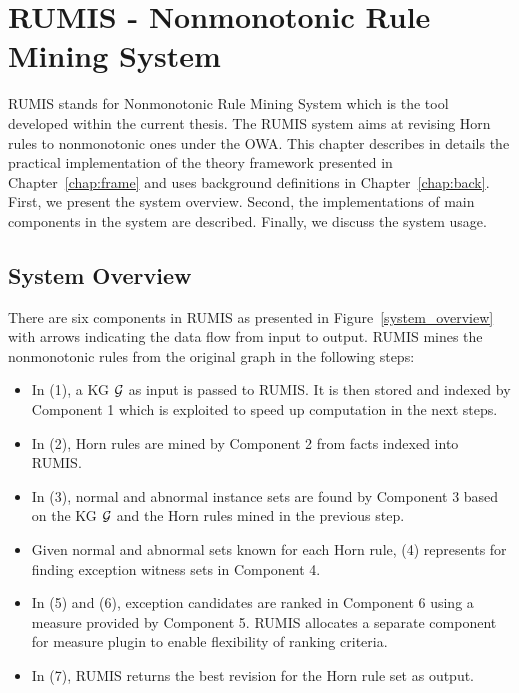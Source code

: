 \chapter{RUMIS - Nonmonotonic Rule Mining System}\label{chap:system}
\label{chap:system}

RUMIS stands for Nonmonotonic Rule Mining System which is the tool developed within the current thesis. The RUMIS system aims at revising Horn rules to nonmonotonic ones under the OWA. This chapter describes in details the practical implementation of the theory framework presented in Chapter~\ref{chap:frame} and uses background definitions in Chapter~\ref{chap:back}. First, we present the system overview. Second, the implementations of main components in the system are described. Finally, we discuss the system usage.

\section{System Overview}
\label{sec:overview}

There are six components in RUMIS as presented in Figure~\ref{system_overview} with arrows indicating the data flow from input to output. RUMIS mines the nonmonotonic rules from the original graph in the following steps:

\begin{itemize}
\item In (1), a KG $\mathcal{G}$ as input is passed to RUMIS. It is then stored and indexed by Component 1 which is exploited to speed up computation in the next steps.
\item In (2), Horn rules are mined by Component 2 from facts indexed into RUMIS.
\item In (3), normal and abnormal instance sets are found by Component 3 based on the KG $\mathcal{G}$ and the Horn rules mined in the previous step.
\item Given normal and abnormal sets known for each Horn rule, (4) represents for finding exception witness sets in Component 4.
\item In (5) and (6), exception candidates are ranked in Component 6 using a measure provided by Component 5. RUMIS allocates a separate component for measure plugin to enable flexibility of ranking criteria.
\item In (7), RUMIS returns the best revision for the Horn rule set as output.
\end{itemize}

